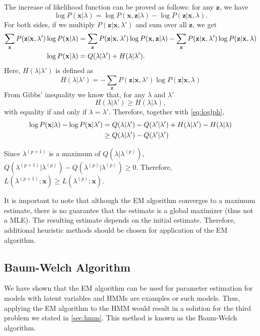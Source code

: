\documentclass[12pt,final,twoside]{report}
\begin{document}
The increase of likelihood function can be proved as follows: for any $\mathbf{z}$, we have
\begin{equation}
  \log P(\mathbf{x}|\lambda) = \log P(\mathbf{x},\mathbf{z}|\lambda) - \log P(\mathbf{z}|\mathbf{x},\lambda). 
\end{equation}
For both sides, if we multiply $P(\mathbf{z}|\mathbf{x},\lambda')$ and sum over all $\mathbf{z}$, we get
\begin{align}
  \sum_{\mathbf{z}} P(\mathbf{z}|\mathbf{x},\lambda') \log P(\mathbf{x}|\lambda) 
  &= \sum_{\mathbf{z}} P(\mathbf{z}|\mathbf{x},\lambda') \log P(\mathbf{x},\mathbf{z}|\lambda)
  - \sum_{\mathbf{z}} P(\mathbf{z}|\mathbf{x},\lambda') \log P(\mathbf{z}|\mathbf{x},\lambda) \notag\\
  \log P(\mathbf{x}|\lambda) &= Q(\lambda|\lambda') + H(\lambda|\lambda')
  \label{eq:loglph}.
\end{align}
Here, $H(\lambda|\lambda')$ is defined as
\begin{equation}
  H(\lambda|\lambda') = - \sum_{\mathbf{z}} P(\mathbf{z}|\mathbf{x},\lambda') \log P(\mathbf{z}|\mathbf{x},\lambda)
\end{equation}
From Gibbs' inequality we know that, for any $\lambda$ and $\lambda'$
\begin{equation}
  H(\lambda|\lambda') \geq H(\lambda|\lambda),
\end{equation}
with equality if and only if $\lambda = \lambda'$. Therefore, together with \cref{eq:loglph},
\begin{align}
  \log P(\mathbf{x}|\lambda) - \log P(\mathbf{x}|\lambda') &= Q(\lambda|\lambda') - Q(\lambda'|\lambda') + H(\lambda|\lambda') -  H(\lambda|\lambda) \notag\\
  & \geq Q(\lambda|\lambda') - Q(\lambda'|\lambda')
\end{align}

Since $\lambda^{(p+1)}$ is a maximum of $Q(\lambda|\lambda^{(p)})$, $Q(\lambda^{(p+1)}|\lambda^{(p)}) - Q(\lambda^{(p)}|\lambda^{(p)}) \geq 0$. Therefore, $L(\lambda^{(p+1)};\mathbf{x}) \geq L(\lambda^{(p)};\mathbf{x})$.

It is important to note that although the EM algorithm converges to a maximum estimate, there is no guarantee that the estimate is a global maximizer (thus not a MLE). The resulting estimate depends on the initial estimate. Therefore, additional heuristic methods should be chosen for application of the EM algorithm.

\subsection{Baum-Welch Algorithm}
We have shown that the EM algorithm can be used for parameter estimation for models with latent variables and HMMs are examples or such models. Thus, applying the EM algorithm to the HMM would result in a solution for the third problem we stated in \cref{sec:hmm}. This method is known as the Baum-Welch algorithm.
\end{document}
